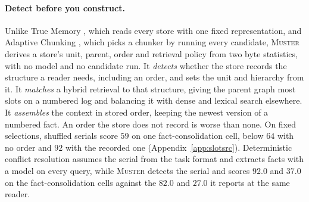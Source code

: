 \documentclass{article}
\newcommand{\sys}{\textsc{Muster}}
\begin{document}
\paragraph{Detect before you construct.} Unlike True Memory \cite{truememory}, which reads every store with one fixed representation, and Adaptive Chunking \cite{adaptivechunk}, which picks a chunker by running every candidate, \sys{} derives a store's unit, parent, order and retrieval policy from two byte statistics, with no model and no candidate run. It \emph{detects} whether the store records the structure a reader needs, including an order, and sets the unit and hierarchy from it. It \emph{matches} a hybrid retrieval to that structure, giving the parent graph most slots on a numbered log and balancing it with dense and lexical search elsewhere. It \emph{assembles} the context in stored order, keeping the newest version of a numbered fact. An order the store does not record is worse than none. On fixed selections, shuffled serials score $59$ on one fact-consolidation cell, below $64$ with no order and $92$ with the recorded one (Appendix~\ref{app:slotsrc}). Deterministic conflict resolution \cite{freshness} assumes the serial from the task format and extracts facts with a model on every query, while \sys{} detects the serial and scores $92.0$ and $37.0$ on the fact-consolidation cells against the $82.0$ and $27.0$ it reports at the same reader.
\end{document}
